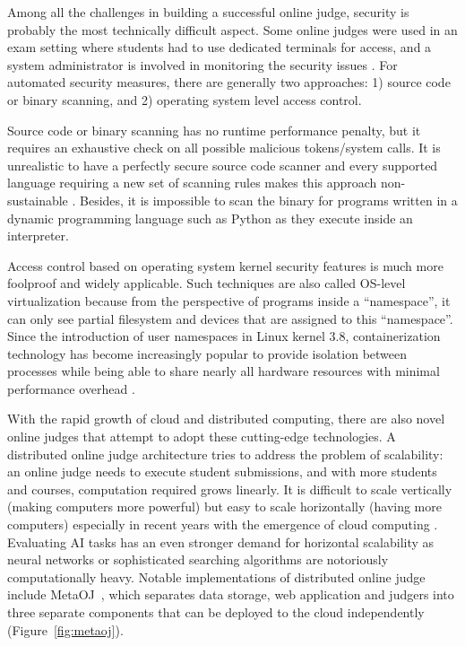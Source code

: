 Among all the challenges in building a successful online judge, security is probably the most technically difficult aspect. Some online judges were used in an exam setting where students had to use dedicated terminals for access, and a system administrator is involved in monitoring the security issues \parencite{10.1145/384267.305835}. For automated security measures, there are generally two approaches: 1) source code or binary scanning, and 2) operating system level access control. 

Source code or binary scanning has no runtime performance penalty, but it requires an exhaustive check on all possible malicious tokens/system calls. It is unrealistic to have a perfectly secure source code scanner and every supported language requiring a new set of scanning rules makes this approach non-sustainable \parencite{RN4}. Besides, it is impossible to scan the binary for programs written in a dynamic programming language such as Python as they execute inside an interpreter.

Access control based on operating system kernel security features is much more foolproof and widely applicable. Such techniques are also called OS-level virtualization because from the perspective of programs inside a ``namespace'', it can only see partial filesystem and devices that are assigned to this “namespace”. Since the introduction of user namespaces in Linux kernel 3.8, containerization technology has become increasingly popular to provide isolation between processes while being able to share nearly all hardware resources with minimal performance overhead \parencite{RN16}. 

With the rapid growth of cloud and distributed computing, there are also novel online judges that attempt to adopt these cutting-edge technologies. A distributed online judge architecture tries to address the problem of scalability: an online judge needs to execute student submissions, and with more students and courses, computation required grows linearly. It is difficult to scale vertically (making computers more powerful) but easy to scale horizontally (having more computers) especially in recent years with the emergence of cloud computing \parencite{RN17}. Evaluating AI tasks has an even stronger demand for horizontal scalability as neural networks or sophisticated searching algorithms are notoriously computationally heavy. Notable implementations of distributed online judge include MetaOJ~\parencite{metaoj}, which separates data storage, web application and judgers into three separate components that can be deployed to the cloud independently (Figure~\ref{fig:metaoj}).

